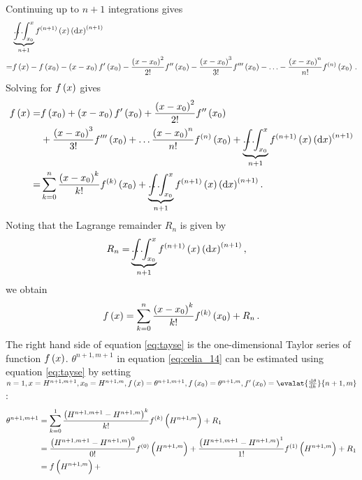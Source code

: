 Continuing up to $n + 1$ integrations gives
\begin{align*}
  &\underbrace{\int \hspace{-4mm} \hdots \hspace{-1mm} \int_{x_0}^x}_{n+1}{f^{\del{ n+1 }}\del{ x }\del{ \dif x }^{\del{ n+1 }}} \\
  = &f\del{ x } - f\del{ x_0 } - \del{ x - x_0 } f'\del{ x_0 } - \frac{\del{ x - x_0 }^2}{2!} f''\del{ x_0 } - \frac{\del{ x - x_0 }^3}{3!} f'''\del{ x_0 } - \mathellipsis - \frac{\del{ x - x_0 }^n}{n!} f^{\del{ n }}\del{ x_0 } \, .
\end{align*}
Solving for $f\del{ x }$ gives
\begin{align*}
  f\del{ x } = &f\del{ x_0 }
           + \del{ x - x_0 } f'\del{ x_0 }
           + \frac{\del{ x-x_0 }^2}{2!} f''\del{ x_0 } \\
         &+ \frac{\del{ x - x_0 }^3}{3!} f'''\del{ x_0 }
           + \mathellipsis \frac{\del{ x - x_0 }^n}{n!} f^{\del{ n }}\del{ x_0 }
           + \underbrace{\int \hspace{-4mm} \hdots \hspace{-1mm} \int_{x_0}^x}_{n+1}{f^{\del{ n+1 }}\del{ x }\del{ \dif x }^{\del{ n+1 }}} \\
  = &\sum_{k=0}^n{\frac{\del{ x - x_0 }^k}{k!}}f^{\del{ k }}\del{ x_0 } + \underbrace{\int \hspace{-4mm} \hdots \hspace{-1mm} \int_{x_0}^x}_{n+1}{f^{\del{ n+1 }}\del{ x }\del{ \dif x }^{\del{ n+1 }}} \, .
\end{align*}
Noting that the Lagrange remainder $R_n$ is given by
\begin{align*}
  R_n = &\underbrace{\int \hspace{-4mm} \hdots \hspace{-1mm} \int_{x_0}^x}_{n+1}{f^{\del{ n+1 }}\del{ x }\del{ \dif x }^{\del{ n+1 }}} \, ,
\end{align*}
we obtain
\begin{equation}
  \label{eq:tayse}
  f\del{ x } = \sum_{k=0}^n{\frac{\del{ x - x_0 }^k}{k!}}f^{\del{ k }}\del{ x_0 } + R_n \, .
\end{equation}
The right hand side of equation \eqref{eq:tayse} is the one-dimensional Taylor series of function $f\del{ x }$.  $\theta^{n+1,m+1}$ in equation \eqref{eq:celia_14} can be estimated using equation \eqref{eq:tayse} by setting $n = 1, x = H^{n+1,m+1}, x_0 = H^{n+1,m}, f\del{ x } = \theta^{n+1,m+1}, f\del{ x_0 } = \theta^{n+1,m}, f'\del{ x_0 } = \evalat{\od{\theta}{h}}{n+1,m}$ \parencite{celia_general_1990}:
\begin{align}
  \label{eq:celia_15}
  \theta^{n+1,m+1} &= \sum_{k=0}^1\frac{\del{ H^{n+1,m+1} - H^{n+1,m} }^k}{k!}f^{\del{ k }}\del{ H^{n+1,m} } + R_1 \\
                   &= \frac{\del{ H^{n+1,m+1} - H^{n+1,m} }^0}{0!} f^{\del{ 0 }}\del{ H^{n+1,m} } + \frac{\del{ H^{n+1,m+1} - H^{n+1,m} }^1}{1!} f^{\del{ 1 }}\del{ H^{n+1,m} } + R_1 \\
                   &= f\del{ H^{n+1,m} } + 
\end{align}

